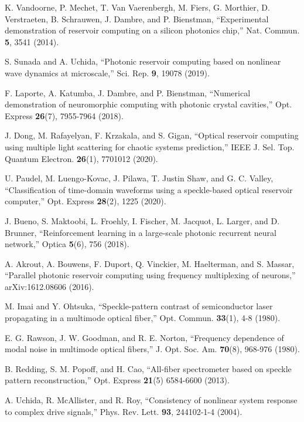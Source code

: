 \documentclass{article}
\begin{document}
\begin{thebibliography}{9}
K. Vandoorne, P. Mechet, T. Van Vaerenbergh, M. Fiers, G. Morthier, D. Verstraeten, B. Schrauwen, J.
Dambre, and P. Bienstman, 
``Experimental demonstration of reservoir computing on a silicon photonics chip,''
Nat. Commun. {\bf 5}, 3541 (2014). 

S. Sunada and A. Uchida, 
``Photonic reservoir computing based on nonlinear wave dynamics at
	microscale,''
Sci. Rep. {\bf 9}, 19078 (2019). 

F. Laporte, A. Katumba, J. Dambre, and P. Bienstman, 
``Numerical demonstration of neuromorphic computing with photonic
crystal cavities,''
Opt. Express {\bf 26}(7), 7955-7964 (2018).

J. Dong, M. Rafayelyan, F. Krzakala, and S. Gigan, 
``Optical reservoir computing using multiple light scattering for
chaotic systems prediction,'' 
IEEE J. Sel. Top. Quantum Electron. {\bf 26}(1), 7701012 (2020).

U. Paudel, M. Luengo-Kovac, J. Pilawa, T. Justin Shaw, and G. C. Valley, 
``Classification of time-domain waveforms using a speckle-based optical
	reservoir computer,'' 
Opt. Express {\bf 28}(2), 1225 (2020).

J. Bueno, S. Maktoobi, L. Froehly, I. Fischer, M. Jacquot, L. Larger,
	and D. Brunner,
``Reinforcement learning in a large-scale photonic recurrent neural
	network,''
Optica {\bf 5}(6), 756 (2018).

A. Akrout, A. Bouwens, F. Duport, Q. Vinckier, M. Haelterman, and 
S. Massar,
``Parallel photonic reservoir computing using
frequency multiplexing of neurons,''
arXiv:1612.08606 (2016).

M. Imai and Y. Ohtsuka, 
``Speckle-pattern contrast of semiconductor laser propagating in a
	multimode optical fiber,'' 
Opt. Commun. {\bf 33}(1), 4-8 (1980).

E. G. Rawson, J. W. Goodman, and R. E. Norton, 
``Frequency dependence of modal noise in multimode optical
fibers,'' J. Opt. Soc. Am. {\bf 70}(8), 968-976 (1980).

B. Redding, S. M. Popoff, and H. Cao,
``All-fiber spectrometer based on speckle pattern
reconstruction,''
Opt. Express {\bf 21}(5) 6584-6600 (2013).

A. Uchida, R. McAllister, and R. Roy, 
``Consistency of nonlinear system response to complex drive signals,'' 
Phys. Rev. Lett. {\bf 93}, 244102-1-4 (2004).


\end{thebibliography}
\end{document}

